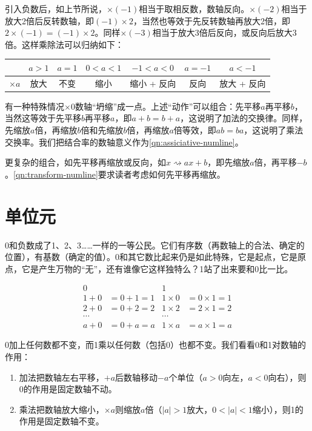 \documentclass[b5paper]{ctexart}
\begin{document}
引入负数后，如上节所说，$\times (-1)$相当于取相反数，数轴反向。$\times (-2)$相当于放大2倍后反转数轴，即$(-1) \times 2$，当然也等效于先反转数轴再放大2倍，即$2 \times (-1) = (-1) \times 2$。同样$\times (-3)$相当于放大3倍后反向，或反向后放大3倍。这样乘除法可以归纳如下：

\begin{center}
  \begin{tabular}{c|c|c|c|c|c|c}
             & $a > 1$ & $a = 1$ & $0 < a < 1$  & $-1 < a < 0$ & $a = -1$ & $a < -1$ \\
  \hline
  $\times a$ & 放大     & 不变    & 缩小          & 缩小 + 反向 & 反向 & 放大 + 反向
  \end{tabular}
\end{center}

有一种特殊情况$\times 0$数轴“坍缩”成一点。上述“动作”可以组合：先平移$a$再平移$b$，当然这等效于先平移$b$再平移$a$，即$a + b = b + a$，这说明了加法的交换律。同样，先缩放$a$倍，再缩放$b$倍和先缩放$b$倍，再缩放$a$倍等效，即$ab = ba$，这说明了乘法交换率。我们把结合率的数轴意义作为\cref{qn:assiciative-numline}。

更复杂的组合，如先平移再缩放或反向，如$x \rightsquigarrow ax + b$，即先缩放$a$倍，再平移$-b$。\cref{qn:transform-numline}要求读者考虑如何先平移再缩放。

\section{单位元}

0和负数成了1、2、3……一样的一等公民。它们有序数（再数轴上的合法、确定的位置），有基数（确定的值）。0和其它数比起来仍是如此特殊，它是起点，它是原点，它是产生万物的“无”，还有谁像它这样独特么？1站了出来要和0比一比。

\begin{align*}
  0     &             &  1 & \\
  1 + 0 & = 0 + 1 = 1  &  1 \times 0 &= 0 \times 1 = 1 \\
  2 + 0 &= 0 + 2 = 2  &  1 \times 2  &= 2 \times 1 = 2 \\
  \cdots &            & \cdots & \\
  a + 0 &= 0 + a = a  &  1 \times a  &= a \times 1 =  a
\end{align*}

0加上任何数都不变，而1乘以任何数（包括0）也都不变。我们看看0和1对数轴的作用：
\begin{enumerate}[(1)]
\item 加法把数轴左右平移，$+a$后数轴移动$-a$个单位（$a > 0$向左，$a < 0$向右），则0的作用是固定数轴不动。
\item 乘法把数轴放大缩小，$\times a$则缩放$a$倍（$|a| > 1$放大，$0 < |a| < 1$缩小），则1的作用是固定数轴不变。
\end{enumerate}
\end{document}
